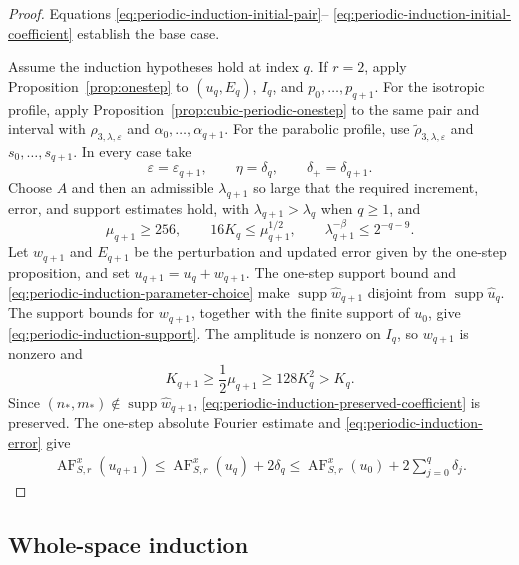 \documentclass[12pt,reqno,letterpaper]{amsart}
\numberwithin{equation}{section}
\theoremstyle{definition}
\newcommand{\eps}{\varepsilon}
\newcommand{\la}{\lambda}
\newcommand{\supp}{\operatorname{supp}}
\begin{document}
\begin{proof}
Equations \eqref{eq:periodic-induction-initial-pair}--
\eqref{eq:periodic-induction-initial-coefficient} establish the base case.

Assume the induction hypotheses hold at index $q$.  If $r=2$, apply
Proposition~\ref{prop:onestep} to $(u_q,E_q)$, $I_q$, and
$p_0,\ldots,p_{q+1}$.  For the isotropic profile, apply
Proposition~\ref{prop:cubic-periodic-onestep} to the same pair and
interval with $\rho_{3,\la,\eps}$ and
$\alpha_0,\ldots,\alpha_{q+1}$.  For the parabolic profile, use
$\widetilde{\rho}_{3,\la,\eps}$ and
$s_0,\ldots,s_{q+1}$.  In every case take
\[
 \eps=\eps_{q+1},\qquad \eta=\delta_q,\qquad
 \delta_+=\delta_{q+1}.
\]
Choose $A$ and then an admissible
$\la_{q+1}$ so large that the required increment, error, and support
estimates hold, with $\la_{q+1}>\la_q$ when $q\geq1$, and
\begin{equation}\label{eq:periodic-induction-parameter-choice}
 \mu_{q+1}\geq256,\qquad
 16K_q\leq\mu_{q+1}^{1/2},\qquad
 \la_{q+1}^{-\beta}\leq2^{-q-9}.
\end{equation}
Let $w_{q+1}$ and $E_{q+1}$ be the perturbation and updated error given
by the one-step proposition, and set
$u_{q+1}=u_q+w_{q+1}$.
The one-step support bound and
\eqref{eq:periodic-induction-parameter-choice} make
$\supp\widehat w_{q+1}$ disjoint from
$\supp\widehat u_q$.  The support bounds for $w_{q+1}$, together with
the finite support of $u_0$, give
\eqref{eq:periodic-induction-support}.  The amplitude is nonzero on $I_q$, so
$w_{q+1}$ is nonzero and
\[
 K_{q+1}\geq\frac12\mu_{q+1}
 \geq128K_q^2>K_q.
\]
Since $(n_*,m_*)\notin\supp\widehat w_{q+1}$,
\eqref{eq:periodic-induction-preserved-coefficient} is preserved.  The one-step
absolute Fourier estimate and \eqref{eq:periodic-induction-error} give
\begin{align*}
 \operatorname{AF}_{S,r}^x(u_{q+1})
 \leq\operatorname{AF}_{S,r}^x(u_q)+2\delta_q
 \leq\operatorname{AF}_{S,r}^x(u_0)
   +2\sum_{j=0}^{q}\delta_j.
\end{align*}
\end{proof}

\subsection{Whole-space induction}
\end{document}
